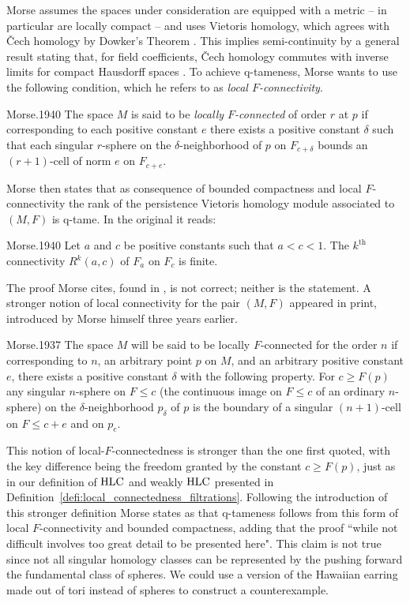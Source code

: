 Morse assumes the spaces under consideration are equipped with a metric -- in particular are locally compact -- and uses Vietoris homology, which agrees with \v{C}ech homology by Dowker's Theorem \cite{Dowker.1952}.
This implies semi-continuity by a general result stating that, for field coefficients, \v{C}ech homology commutes with inverse limits for compact Hausdorff spaces \cite[Theorem VIII.3.6 and Theorem X.3.1]{MR0050886}.
To achieve q-tameness, Morse wants to use the following condition, which he refers to as \textit{local $F$-connectivity}. 
\begin{displaycquote}[p.431]{Morse.1940}
	The space $M$ is said to be \textit{locally $F$-connected} of order $r$ at $p$ if corresponding to each positive constant $e$ there exists a positive constant $\delta$ such that each singular $r$-sphere on the $\delta$-neighborhood of $p$ on $F_{c+\delta}$ bounds an $(r+1)$-cell of norm $e$ on $F_{c+e}$.
\end{displaycquote}
Morse then states that as consequence of bounded compactness and local $F$-connectivity the rank of the persistence Vietoris homology module associated to $(M, F)$ is q-tame.
In the original it reads:
\begin{displaycquote}[Theorem 6.3, p.432]{Morse.1940}
	Let $a$ and $c$ be positive constants such that $a < c < 1$.
	The $k^{\mathrm{th}}$ connectivity $R^k(a,c)$ of $F_a$ on $F_c$ is finite.
\end{displaycquote}
The proof Morse cites, found in \cite[Theorem 6.1]{Morse.1938}, is not correct; neither is the statement.
A stronger notion of local connectivity for the pair $(M, F)$ appeared in print, introduced by Morse himself three years earlier.
\begin{displaycquote}[p.421-422]{Morse.1937}
	The space $M$ will be said to be locally $F$-connected for the order $n$ if corresponding to $n$, an arbitrary point $p$ on $M$, and an arbitrary positive constant $e$, there exists a positive constant $\delta$ with the following property. For $c \geq F(p)$ any singular $n$-sphere on $F \leq c$ (the continuous image on $F \leq c$ of an ordinary $n$-sphere) on the $\delta$-neighborhood $p_{\delta}$ of $p$ is the boundary of a singular $(n + 1)$-cell on $F \leq c + e$ and on $p_e$.
\end{displaycquote}
This notion of local-$F$-connectedness is stronger than the one first quoted, with the key difference being the freedom granted by the constant $c \geq F(p)$, just as in our definition of $\mathrm{HLC}$ and weakly $\mathrm{HLC}$ presented in Definition~\ref{defi:local_connectedness_filtrations}.
Following the introduction of this stronger definition Morse states as \cite[Theorem~9.2, p.422]{Morse.1937} that q-tameness follows from this form of local $F$-connectivity and bounded compactness, adding that the proof ``while not difficult involves too great detail to be presented here".
This claim is not true since not all singular homology classes can be represented by the pushing forward the fundamental class of spheres.
We could use a version of the Hawaiian earring made out of tori instead of spheres to construct a counterexample.

